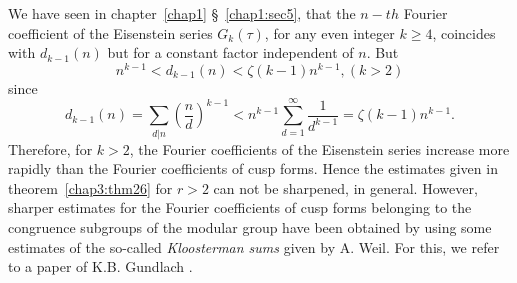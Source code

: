 We have seen in chapter~\ref{chap1} \S~\ref{chap1:sec5}, 
that the $n-th$ Fourier coefficient of
the Eisenstein series $G_k(\tau)$, for any even integer $k\geq 4$,
coincides with \pageoriginale $d_{k-1}(n)$ but for a constant factor
independent of $n$. But 
$$
n^{k-1} <d_{k-1}(n) < \zeta (k-1) n^{k-1}, (k>2)
$$
since 
$$
d_{k-1}(n) = \sum_{d|n} (\frac{n}{d})^{k-1} < n^{k-1}
\sum^{\infty}_{d=1} \frac{1}{d^{k-1}} = \zeta (k-1) n^{k-1}.
$$
Therefore, for $k>2$, the Fourier coefficients of the Eisenstein
series increase more rapidly than the Fourier coefficients of cusp
forms. Hence the estimates given in theorem~\ref{chap3:thm26} 
for $r>2$ can not be
sharpened, in general. However, sharper estimates for the Fourier
coefficients of cusp forms belonging to the congruence subgroups of
the modular group have been obtained by using some estimates of the
so-called \textit{Kloosterman sums} given by A. Weil. For this, we
refer to a paper of K.B. Gundlach \cite{c3:key1}. 

